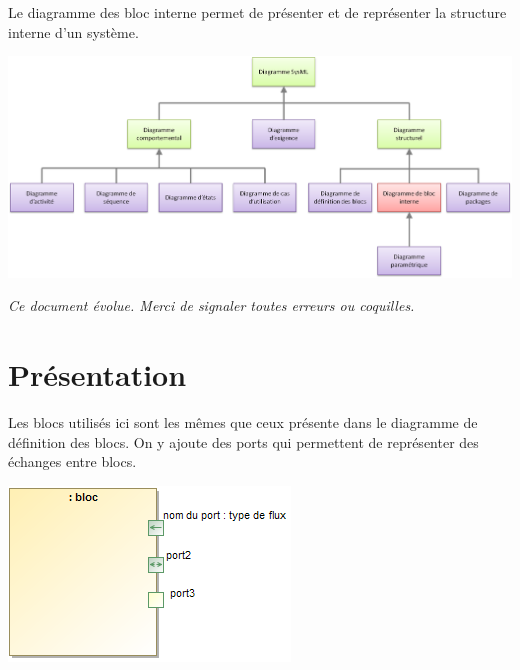 \documentclass[11pt,oneside]{article}
\begin{document}
Le diagramme des bloc interne permet de présenter et de représenter la structure interne d'un système.
\begin{center}
\includegraphics[width=\textwidth]{png/ibd}
\end{center}
 
\setlength{\parskip}{0ex plus 0.2ex minus 0ex}
 \renewcommand{\contentsname}{}
 \renewcommand{\baselinestretch}{1}

\tableofcontents

 \renewcommand{\baselinestretch}{1.2}
\setlength{\parskip}{2ex plus 0.5ex minus 0.2ex}

\textit{Ce document évolue. Merci de signaler toutes erreurs ou coquilles.}

\section{Présentation}

\begin{rem}
\begin{minipage}[c]{.7\linewidth}
Les blocs utilisés ici sont les mêmes que ceux présente dans le diagramme de définition des blocs. On y ajoute des ports qui permettent de représenter des échanges entre blocs. 
\end{minipage}\hfill
\begin{minipage}[c]{.25\linewidth}
\begin{center}
\includegraphics[width=.9\textwidth]{png/block}
\end{center}
\end{minipage}
\end{rem}
\end{document}
